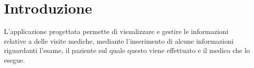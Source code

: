 \documentclass[a4paper,12pt]{article}
\begin{document}
{\linespread{1.3}\selectfont
\newpage
\null
\thispagestyle{empty}
\newpage


\section*{Introduzione} 
L’applicazione progettata permette di visualizzare e gestire le informazioni relative a delle visite mediche, mediante l’inserimento di alcune informazioni riguardanti l’esame, il paziente sul quale questo viene effettuato e il medico che lo esegue. 


}
\end{document}
